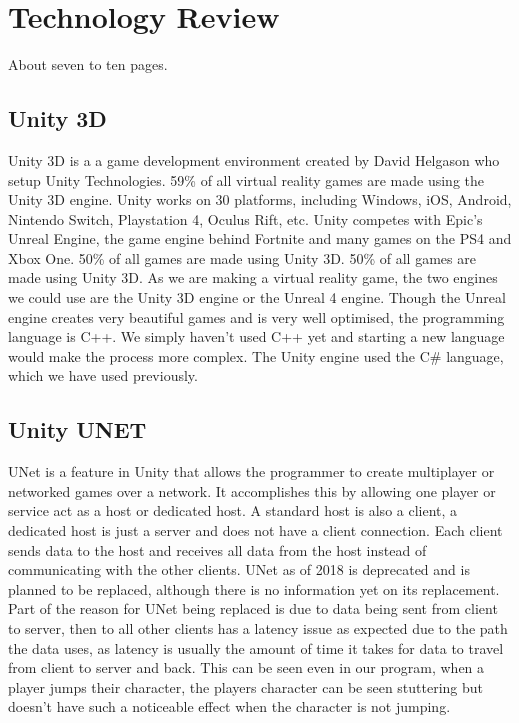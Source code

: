 
\chapter{Technology Review}
About seven to ten pages.

\section {Unity 3D}
Unity 3D is a a game development environment created by David Helgason who setup Unity Technologies. 59\% of all virtual reality games are made using the Unity 3D engine. Unity works on 30 platforms, including Windows, iOS, Android, Nintendo Switch, Playstation 4, Oculus Rift, etc. Unity competes with Epic’s Unreal Engine, the game engine behind Fortnite and many games on the PS4 and Xbox One. 50\% of all games are made using Unity 3D. 50\% of all games are made using Unity 3D. As we are making a virtual reality game, the two engines we could use are the Unity 3D engine or the Unreal 4 engine. Though the Unreal engine creates very beautiful games and is very well optimised, the programming language is C++. We simply haven't used C++ yet and starting a new language would make the process more complex. The Unity engine used the C# language, which we have used previously.

\section {Unity UNET}
UNet is a feature in Unity that allows the programmer to create multiplayer or networked games over a network. It accomplishes this by allowing one player or service act as a host or dedicated host. A standard host is also a client, a dedicated host is just a server and does not have a client connection. Each client sends data to the host and receives all data from the host instead of communicating with the other clients. UNet as of 2018 is deprecated and is planned to be replaced, although there is no information yet on its replacement. Part of the reason for UNet being replaced is due to data being sent from client to server, then to all other clients has a latency issue as expected due to the path the data uses, as latency is usually the amount of time it takes for data to travel from client to server and back. This can be seen even in our program, when a player jumps their character, the players character can be seen stuttering but doesn't have such a noticeable effect when the character is not jumping.

